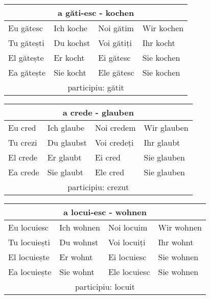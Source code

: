 \documentclass[11pt, oneside]{article}
\begin{document}
%
\begin{center}
  \begin{tabular}{ |p{3.25cm}|p{3.25cm}||p{3.25cm}|p{3.25cm}| }
      \hline
      \multicolumn{4}{|c|}{a găti-esc - kochen} \\
      \hline
      \hline
      Eu gătesc & Ich koche & Noi gătim & Wir kochen\\
      \hline
      Tu gătești & Du kochst & Voi gătiți & Ihr kocht\\
      \hline
      El gătește & Er kocht & Ei gătesc & Sie kochen\\ 
      Ea gătește & Sie kocht & Ele gătesc & Sie kochen\\
      \hline
      \multicolumn{4}{|c|}{participiu: gătit} \\
      \hline
     \end{tabular}
\end{center}
%
\begin{center}
  \begin{tabular}{ |p{3.25cm}|p{3.25cm}||p{3.25cm}|p{3.25cm}| }
      \hline
      \multicolumn{4}{|c|}{a crede - glauben} \\
      \hline
      \hline
      Eu cred & Ich glaube & Noi credem & Wir glauben\\
      \hline
      Tu crezi & Du glaubst & Voi credeți & Ihr glaubt\\
      \hline
      El crede & Er glaubt & Ei cred & Sie glauben\\ 
      Ea crede & Sie glaubt & Ele cred & Sie glauben\\
      \hline
      \multicolumn{4}{|c|}{participiu: crezut} \\
      \hline
     \end{tabular}
\end{center}
%
\begin{center}
  \begin{tabular}{ |p{3.25cm}|p{3.25cm}||p{3.25cm}|p{3.25cm}| }
      \hline
      \multicolumn{4}{|c|}{a locui-esc - wohnen} \\
      \hline
      \hline
      Eu locuiesc & Ich wohnen & Noi locuim & Wir wohnen\\
      \hline
      Tu locuiești & Du wohnst & Voi locuiți & Ihr wohnt\\
      \hline
      El locuiește & Er wohnt & Ei locuiesc & Sie wohnen\\ 
      Ea locuiește & Sie wohnt & Ele locuiesc & Sie wohnen\\
      \hline
      \multicolumn{4}{|c|}{participiu: locuit} \\
      \hline
     \end{tabular}
\end{center}
\end{document}
